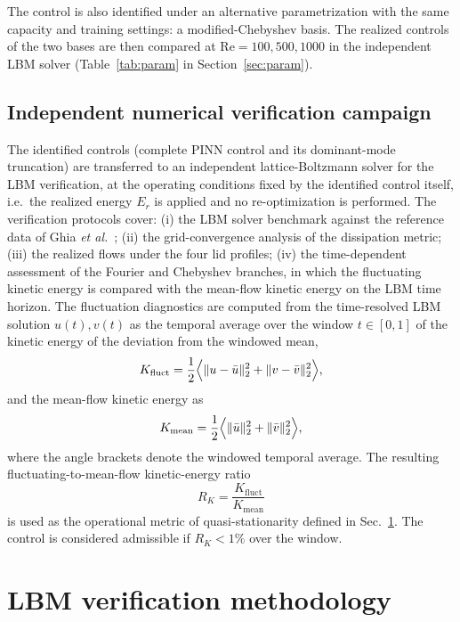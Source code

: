 \documentclass[aip,pof,reprint,superscriptaddress]{revtex4-2}
\newcommand{\re}{\mathrm{Re}}
\begin{document}
The control is also identified under an alternative parametrization with the same capacity and training settings: a modified-Chebyshev basis. The realized controls of the two bases are then compared at $\re=100,500,1000$ in the independent LBM solver (Table~\ref{tab:param} in Section~\ref{sec:param}).

\subsection{Independent numerical verification campaign}\label{sec:verification_campaign}

The identified controls (complete PINN control and its dominant-mode truncation) are transferred to an independent lattice-Boltzmann solver for the LBM verification, at the operating conditions fixed by the identified control itself, i.e.\ the realized energy $E_r$ is applied and no re-optimization is performed. The verification protocols cover: (i) the LBM solver benchmark against the reference data of Ghia \emph{et al.}~\cite{ghia1982high}; (ii) the grid-convergence analysis of the dissipation metric; (iii) the realized flows under the four lid profiles; (iv) the time-dependent assessment of the Fourier and Chebyshev branches, in which the fluctuating kinetic energy is compared with the mean-flow kinetic energy on the LBM time horizon. The fluctuation diagnostics are computed from the time-resolved LBM solution $u(t),v(t)$ as the temporal average over the window $t\in[0,1]$ of the kinetic energy of the deviation from the windowed mean,
\begin{equation}\label{eq:kfluct}
K_{\mathrm{fluct}}=\frac{1}{2}\Bigl\langle \|u-\bar u\|_2^2+\|v-\bar v\|_2^2\Bigr\rangle,
\end{equation}
and the mean-flow kinetic energy as
\begin{equation}\label{eq:kmean}
K_{\mathrm{mean}}=\frac{1}{2}\Bigl\langle \|\bar u\|_2^2+\|\bar v\|_2^2\Bigr\rangle,
\end{equation}
where the angle brackets denote the windowed temporal average. The resulting fluctuating-to-mean-flow kinetic-energy ratio
\begin{equation}\label{eq:rk}
R_K=\frac{K_{\mathrm{fluct}}}{K_{\mathrm{mean}}}
\end{equation}
is used as the operational metric of quasi-stationarity defined in Sec.~\ref{sec:lbm}. The control is considered admissible if $R_K<1\%$ over the window.

\section{LBM verification methodology}\label{sec:lbm}
\end{document}
